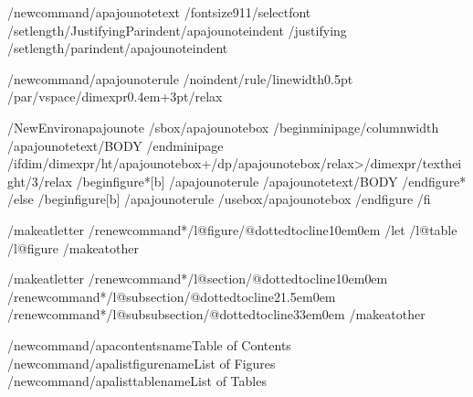/newcommand{/apajounotetext}{%
  /fontsize{9}{11}/selectfont
  /setlength{/JustifyingParindent}{/apajounoteindent}%
  /justifying
  /setlength{/parindent}{/apajounoteindent}}

/newcommand{/apajounoterule}{%
  /noindent/rule{/linewidth}{0.5pt}%
  /par/vspace{/dimexpr0.4em+3pt/relax}}

/NewEnviron{apajounote}{%
  /sbox{/apajounotebox}{%
    /begin{minipage}{/columnwidth}%
      /apajounotetext/BODY
    /end{minipage}}%
  /ifdim/dimexpr/ht/apajounotebox+/dp/apajounotebox/relax>/dimexpr/textheight/3/relax
    /begin{figure*}[b]%
      /apajounoterule
      /apajounotetext/BODY
    /end{figure*}%
  /else
    /begin{figure}[b]%
      /apajounoterule
      /usebox{/apajounotebox}%
    /end{figure}%
  /fi}

%
/makeatletter
/renewcommand*/l@figure{/@dottedtocline{1}{0em}{0em}}
/let /l@table /l@figure
/makeatother

/makeatletter
/renewcommand*/l@section{/@dottedtocline{1}{0em}{0em}}
/renewcommand*/l@subsection{/@dottedtocline{2}{1.5em}{0em}}
/renewcommand*/l@subsubsection{/@dottedtocline{3}{3em}{0em}}
/makeatother

/newcommand{/apacontentsname}{Table of Contents}
/newcommand{/apalistfigurename}{List of Figures}
/newcommand{/apalisttablename}{List of Tables}

